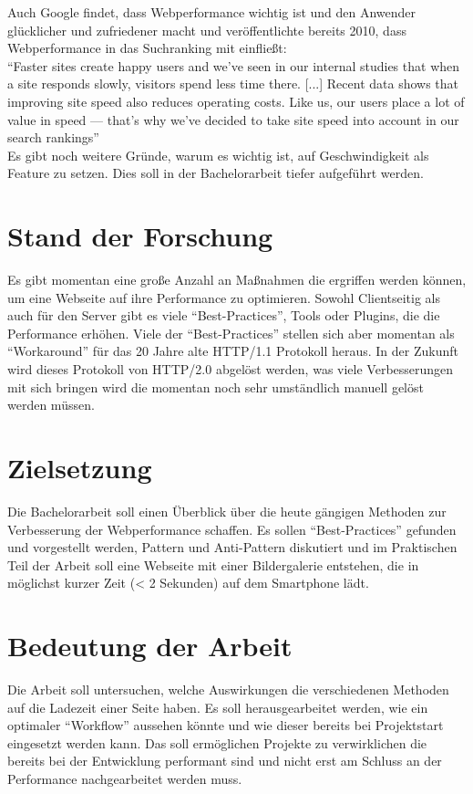 \documentclass[a4paper,11pt,singlespacing]{article}
\begin{document}
	Auch Google findet, dass Webperformance wichtig ist und den Anwender glücklicher und zufriedener macht und veröffentlichte bereits 2010, dass Webperformance in das Suchranking mit einfließt:\\

	"`Faster sites create happy users and we've seen in our internal studies that when a site responds slowly, visitors spend less time there. [...] Recent data shows that improving site speed also reduces operating costs. Like us, our users place a lot of value in speed — that's why we've decided to take site speed into account in our search rankings"'\autocite{google10}\\

	Es gibt noch weitere Gründe, warum es wichtig ist, auf Geschwindigkeit als Feature zu setzen. Dies soll in der Bachelorarbeit tiefer aufgeführt werden.


\section{Stand der Forschung} %
\label{sec:stand_der_forschung}
	Es gibt momentan eine große Anzahl an Maßnahmen die ergriffen werden können, um eine Webseite auf ihre Performance zu optimieren. Sowohl Clientseitig als auch für den Server gibt es viele "`Best-Practices"', Tools oder Plugins, die die Performance erhöhen. Viele der "`Best-Practices"' stellen sich aber momentan als "`Workaround"' für das 20 Jahre alte HTTP/1.1 Protokoll heraus. In der Zukunft wird dieses Protokoll von HTTP/2.0 abgelöst werden, was viele Verbesserungen mit sich bringen wird die momentan noch sehr umständlich manuell gelöst werden müssen.



\section{Zielsetzung} %
\label{sec:zielsetzung}
	Die Bachelorarbeit soll einen Überblick über die heute gängigen Methoden zur Verbesserung der Webperformance schaffen. Es sollen "`Best-Practices"' gefunden und vorgestellt werden, Pattern und Anti-Pattern diskutiert und im Praktischen Teil der Arbeit soll eine Webseite mit einer Bildergalerie entstehen, die in möglichst kurzer Zeit (< 2 Sekunden) auf dem Smartphone lädt.



\section{Bedeutung der Arbeit} %
\label{sec:bedeutung_der_arbeit}
	Die Arbeit soll untersuchen, welche Auswirkungen die verschiedenen Methoden auf die Ladezeit einer Seite haben. Es soll herausgearbeitet werden, wie ein optimaler "`Workflow"' aussehen könnte und wie dieser bereits bei Projektstart eingesetzt werden kann. Das soll ermöglichen Projekte zu verwirklichen die bereits bei der Entwicklung performant sind und nicht erst am Schluss an der Performance nachgearbeitet werden muss. 
\end{document}
